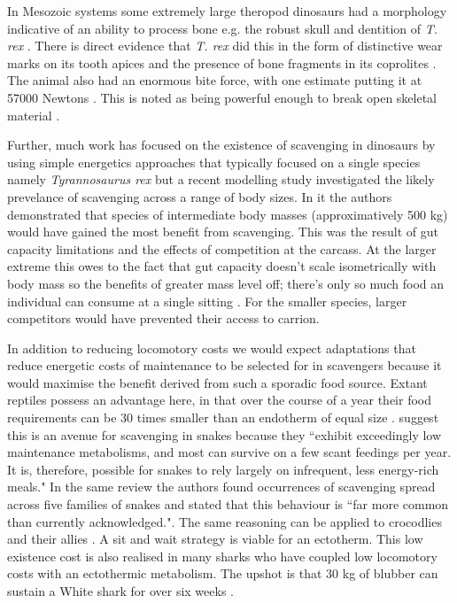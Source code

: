 \documentclass[a4paper,12pt]{article}
\begin{document}
In Mesozoic systems some extremely large theropod dinosaurs had a morphology indicative of an ability to process bone e.g. the robust skull and dentition of \textit{T. rex} \citep{hone2010feeding}.
There is direct evidence that \textit{T. rex} did this in the form of distinctive wear marks on its tooth apices \citep{farlow1994wear,schubert2005wear} and the presence of bone fragments in its coprolites \citep{chin1998king}.
The animal also had an enormous bite force, with one estimate putting it at 57000 Newtons \citep{bates2012estimating}.
This is noted as being powerful enough to break open skeletal material \citep{rayfield2001cranial}.

Further, much work has focused on the existence of scavenging in dinosaurs by using simple energetics approaches that typically focused on a single species namely \textit{Tyrannosaurus rex} \citep{ruxton2003could,carbone2011intra} but a recent modelling study investigated the likely prevelance of scavenging across a range of body sizes.
In it the authors demonstrated that species of intermediate body masses (approximatively 500 kg) would have gained the most benefit from scavenging.
This was the result of gut capacity limitations and the effects of competition at the carcass.
At the larger extreme this owes to the fact that gut capacity doesn't scale isometrically with body mass so the benefits of greater mass level off; there's only so much food an individual can consume at a single sitting \citep{calder1996size}.
For the smaller species, larger competitors would have prevented their access to carrion.

In addition to reducing locomotory costs we would expect adaptations that reduce energetic costs of maintenance to be selected for in scavengers because it would maximise the benefit derived from such a sporadic food source. 
Extant reptiles possess an advantage here, in that over the course of a year their food requirements can be 30 times smaller than an endotherm of equal size \citep{Nagy1621}.
\cite{devault2002scavenging} suggest this is an avenue for scavenging in snakes because they ``exhibit  exceedingly  low  maintenance  metabolisms,  and most  can  survive  on  a  few  scant  feedings per year.
It  is, therefore, possible for snakes to rely largely  on  infrequent,  less  energy-rich  meals." In the same review the authors found occurrences of scavenging spread across five families of snakes and stated that this behaviour is ``far more common than currently acknowledged."\citep{devault2002scavenging}.
The same reasoning can be applied to crocodlies and their allies \citep{forrest2003evidence}. 
A sit and wait strategy is viable for an ectotherm. 
This low existence cost is also realised in many sharks who have coupled low locomotory costs with an ectothermic metabolism. 
The upshot is that 30 kg of blubber can sustain a White shark for over six weeks \citep{carey1982temperature}. 
\end{document}
